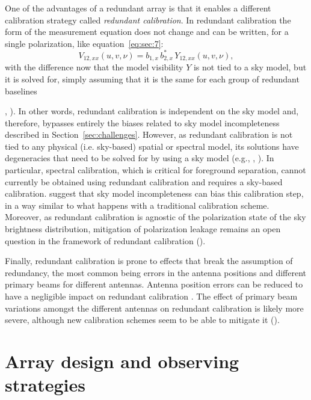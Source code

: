 One of the advantages of a redundant array is that it enables a different calibration strategy called {\it redundant calibration}. In redundant calibration the form of the measurement equation does not change and can be written, for a single polarization, like equation~\ref{eq:sec:7}:
\begin{equation}
V_{12,xx} (u,v,\nu) = b_{1,x} \, b_{2,x}^* \, Y_{12,xx} (u,v,\nu),
\label{eq:sec:13}
\end{equation}
with the difference now that the model visibility $Y$ is not tied to a sky model, but it is solved for, simply assuming that it is the same for each group of redundant baselines {\cite{wieringa92}, \cite{liu10}). In other words, redundant calibration is independent on the sky model and, therefore, bypasses entirely the biases related to sky model incompleteness described in Section~\ref{sec:challenges}. However, as redundant calibration is not tied to any physical (i.e. sky-based) spatial or spectral model, its solutions have degeneracies that need to be solved for by using a sky model (e.g., \cite{zheng14}, \cite{byrne19}). In particular, spectral calibration, which is critical for foreground separation, cannot currently be obtained using redundant calibration and requires a sky-based calibration. \cite{byrne19} suggest that sky model incompleteness can bias this calibration step, in a way similar to what happens with a traditional calibration scheme. Moreover, as redundant calibration is agnostic of the polarization state of the sky brightness distribution, mitigation of polarization leakage remains an open question in the framework of redundant calibration (\cite{dillon18}). 

Finally, redundant calibration is prone to effects that break the assumption of redundancy, the most common being errors in the antenna positions and different primary beams for different antennas. Antenna position errors can be reduced to have a negligible impact on redundant calibration \cite{joseph18}. The effect of primary beam variations amongst the different antennas on redundant calibration is likely more severe, although new calibration schemes seem to be able to mitigate it (\cite{orosz19}).



\section{Array design and observing strategies}
\label{sec:design}

}
